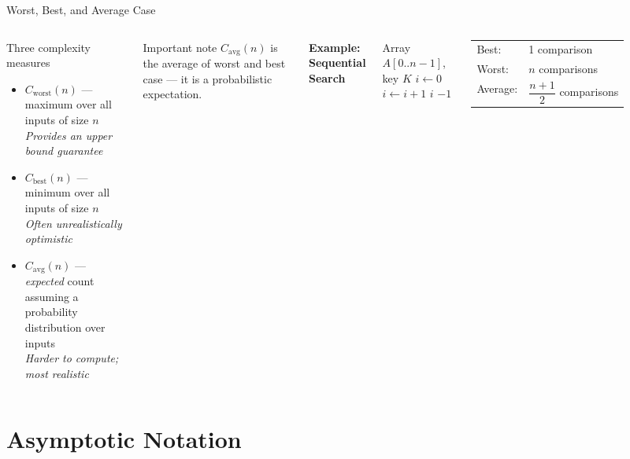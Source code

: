 \documentclass[aspectratio=169]{beamer}
\begin{document}
\begin{frame}[shrink=12]{Worst, Best, and Average Case}
  \begin{columns}[T]
      \begin{block}{Three complexity measures}
        \begin{itemize}
          \item $C_{\text{worst}}(n)$ — maximum over all inputs of size $n$\\
                \textit{Provides an upper bound guarantee}
          \item $C_{\text{best}}(n)$ — minimum over all inputs of size $n$\\
                \textit{Often unrealistically optimistic}
          \item $C_{\text{avg}}(n)$ — \emph{expected} count assuming a
                probability distribution over inputs\\
                \textit{Harder to compute; most realistic}
        \end{itemize}
      \end{block}
      \vspace{0.3em}
      \begin{alertblock}{Important note}
        $C_{\text{avg}}(n)$ is  the average of worst and best
        case — it is a probabilistic expectation.
      \end{alertblock}
      \textbf{Example: Sequential Search}
      \begin{algorithmic}[1]
        \Require Array $A[0..n{-}1]$, key $K$
        \State $i \gets 0$
          \State $i \gets i + 1$
        \EndWhile
         \Return $i$
        \Else\; \Return $-1$
        \EndIf
      \end{algorithmic}
      \vspace{0.3em}
      \begin{tabular}{ll}
        Best:    & 1 comparison \\
        Worst:   & $n$ comparisons \\
        Average: & $\dfrac{n+1}{2}$ comparisons \\
      \end{tabular}
  \end{columns}
\end{frame}

\section{Asymptotic Notation}
\end{document}
